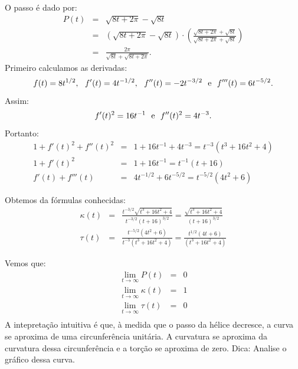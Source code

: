   \begin{resol}
    O passo é dado por:
    \begin{eqnarray*}
      P(t) &=& \sqrt{8t+2\pi}- \sqrt{8t}\\
      &=&\left(\sqrt{8t+2\pi}- \sqrt{8t}\right)\cdot\left(\frac{\sqrt{8t+2\pi}+\sqrt{8t}}{ \sqrt{8t+2\pi}+\sqrt{8t}}\right)\\
      &=&\frac{2\pi}{\sqrt{8t} + \sqrt{8t+2\pi}}.
    \end{eqnarray*}
  Primeiro calculamos as derivadas:
  $$f(t)=8t^{1/2}, ~~ f'(t)=4 t^{-1/2}, ~~ f''(t)=-2 t^{-3/2} ~ \hbox{ e } ~ f'''(t)=6 t^{-5/2}.$$
  Assim:
  $$f'(t)^2=16 t^{-1} ~ \hbox{ e } ~ f''(t)^2=4 t^{-3}.$$
  Portanto:
  \begin{eqnarray*}
   1+f'(t)^2+f''(t)^2 &=& 1 + 16t^{-1} + 4t^{-3} = t^{-3}\left(t^{3} + 16t^{2} + 4\right)\\
   1+f'(t)^2 &=&1+16t^{-1}=t^{-1}\left(t + 16\right)\\
   f'(t)+f'''(t) &=&4t^{-1/2}+6t^{-5/2}=t^{-5/2}\left(4t^2 + 6\right)
     \end{eqnarray*}

Obtemos da fórmulas conhecidas:
\begin{eqnarray*}
  \kappa(t) &=& \frac{t^{-3/2}\sqrt{t^{3} + 16t^{2} + 4}}{t^{-3/2}\left(t+16\right)^{3/2}}= \frac{\sqrt{t^{3} + 16t^{2} + 4}}{\left(t+16\right)^{3/2}}\\
\tau(t) &=& \frac{t^{-5/2}\left(4t^2 + 6\right)}{t^{-3}\left(t^{3} + 16t^{2} + 4\right)} =\frac{t^{1/2}\left(4t + 6\right)}{\left(t^{3} + 16t^{2} + 4\right)}
\end{eqnarray*}

Vemos que:
\begin{eqnarray*}
  \lim_{t\to \infty} P(t) &=& 0\\
  \lim_{t\to \infty} \kappa(t) &=& 1\\
  \lim_{t\to \infty} \tau(t) &=& 0\\
\end{eqnarray*}
A intepretação intuitiva é que, à medida que o passo da hélice decresce, a curva se aproxima de uma circunferência unitária.  A curvatura se aproxima da curvatura dessa circunferência e a torção se aproxima de zero. Dica: Analise o gráfico dessa curva.
  \end{resol}
  


